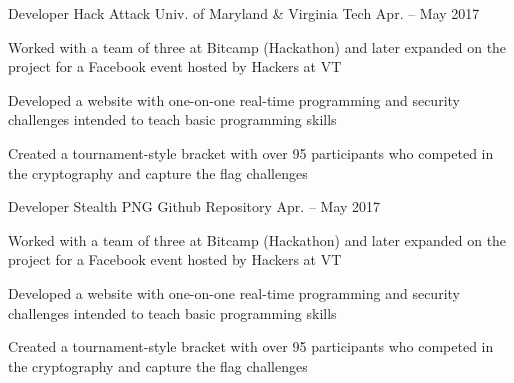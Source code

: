 

\begin{cventries}

  \cventry
    {Developer} %
    {Hack Attack} %
    {Univ. of Maryland \& Virginia Tech} %
    {Apr. – May 2017} %
    {
      \begin{cvitems} %
      \item {Worked with a team of three at Bitcamp (Hackathon) and later expanded on the project for a Facebook event hosted by Hackers at VT}
      \item {Developed a website with one-on-one real-time programming and security challenges intended to teach basic programming skills}
      \item {Created a tournament-style bracket with over 95 participants who competed in the cryptography and capture the flag challenges}
      \end{cvitems}
    }

  \cventry
    {Developer} %
    {Stealth PNG} %
    {Github Repository} %
    {Apr. – May 2017} %
    {
      \begin{cvitems} %
      \item {Worked with a team of three at Bitcamp (Hackathon) and later expanded on the project for a Facebook event hosted by Hackers at VT}
      \item {Developed a website with one-on-one real-time programming and security challenges intended to teach basic programming skills}
      \item {Created a tournament-style bracket with over 95 participants who competed in the cryptography and capture the flag challenges}
      \end{cvitems}
    }

\end{cventries}
